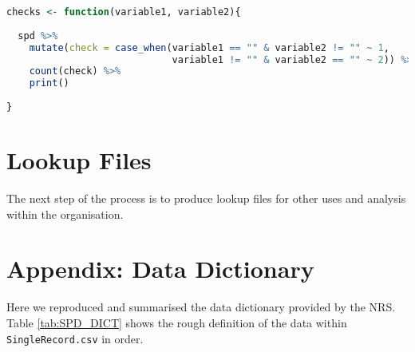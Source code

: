 \documentclass[12pt]{article}
\begin{document}
\begin{lstlisting}[language=R,frame=single]
checks <- function(variable1, variable2){
  
  spd %>% 
    mutate(check = case_when(variable1 == "" & variable2 != "" ~ 1, 
                             variable1 != "" & variable2 == "" ~ 2)) %>% 
    count(check) %>% 
    print()
  
}

\end{lstlisting}
 
\section{Lookup Files}
The next step of the process is to produce lookup files for
other uses and analysis within the organisation.



\appendix
\section{Appendix: Data Dictionary}\label{appendix:dict}
Here we reproduced and summarised the data dictionary provided by the NRS. Table {\ref{tab:SPD_DICT}} shows the rough definition of the data within \texttt{SingleRecord.csv}
in order.
\end{document}
